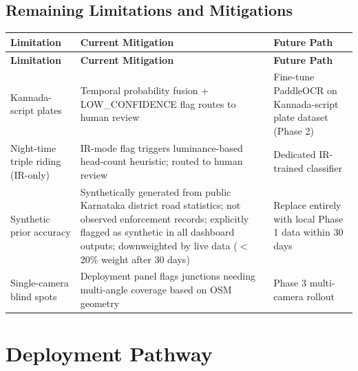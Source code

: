 \documentclass[11pt,a4paper]{article}
\begin{document}
\subsection*{Remaining Limitations and Mitigations}

\begin{longtable}{L{3.5cm} L{5.5cm} L{5.5cm}}
    \toprule
    \color{white}\textbf{Limitation} & \color{white}\textbf{Current Mitigation} & \color{white}\textbf{Future Path} \\
    \midrule
    \endfirsthead
    \toprule
    \color{white}\textbf{Limitation} & \color{white}\textbf{Current Mitigation} & \color{white}\textbf{Future Path} \\
    \midrule
    \endhead
    \bottomrule
    \endfoot

    Kannada-script plates & Temporal probability fusion + LOW\_CONFIDENCE flag routes to human review & Fine-tune PaddleOCR on Kannada-script plate dataset (Phase 2) \\
    Night-time triple riding (IR-only) & IR-mode flag triggers luminance-based head-count heuristic; routed to human review & Dedicated IR-trained classifier \\
    Synthetic prior accuracy & Synthetically generated from public Karnataka district road statistics; not observed enforcement records; explicitly flagged as synthetic in all dashboard outputs; downweighted by live data ($<$20\% weight after 30 days) & Replace entirely with local Phase 1 data within 30 days \\
    Single-camera blind spots & Deployment panel flags junctions needing multi-angle coverage based on OSM geometry & Phase 3 multi-camera rollout \\
\end{longtable}

\section{Deployment Pathway}
\end{document}
